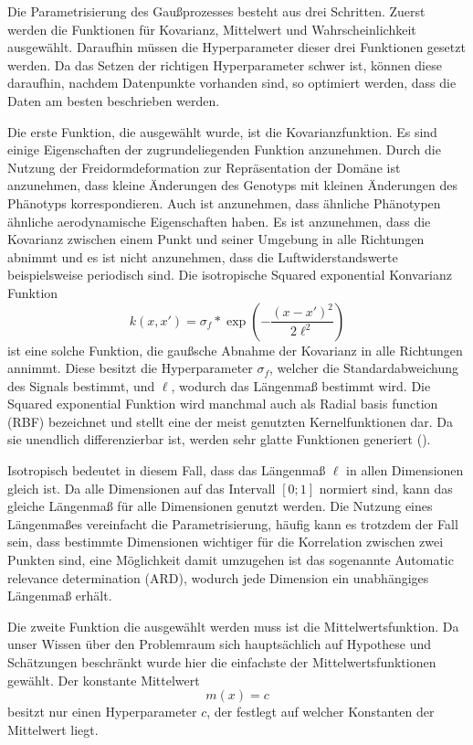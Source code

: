 Die Parametrisierung des Gaußprozesses besteht aus drei Schritten.
Zuerst werden die Funktionen für Kovarianz, Mittelwert und Wahrscheinlichkeit ausgewählt.
Daraufhin müssen die Hyperparameter dieser drei Funktionen gesetzt werden.
Da das Setzen der richtigen Hyperparameter schwer ist, können diese daraufhin, nachdem Datenpunkte vorhanden sind, so optimiert werden, dass die Daten am besten beschrieben werden.

Die erste Funktion, die ausgewählt wurde, ist die Kovarianzfunktion.
Es sind einige Eigenschaften der zugrundeliegenden Funktion anzunehmen.
Durch die Nutzung der Freidormdeformation zur Repräsentation der Domäne ist anzunehmen, dass kleine Änderungen des Genotyps mit kleinen Änderungen des Phänotyps korrespondieren.
Auch ist anzunehmen, dass ähnliche Phänotypen ähnliche aerodynamische Eigenschaften haben.
Es ist anzunehmen, dass die Kovarianz zwischen einem Punkt und seiner Umgebung in alle Richtungen abnimmt und es ist nicht anzunehmen, dass die Luftwiderstandswerte beispielsweise periodisch sind.
Die isotropische Squared exponential Konvarianz Funktion  
\[
	k(x,x') = \sigma_f * \exp\left(-\frac{(x-x')^2}{2\ell^2}\right)
\]
ist eine solche Funktion, die gaußsche Abnahme der Kovarianz in alle Richtungen annimmt.
Diese besitzt die Hyperparameter $\sigma_f$, welcher die Standardabweichung des Signals bestimmt, und $\ell$, wodurch das Längenmaß bestimmt wird.
Die Squared exponential Funktion wird manchmal auch als Radial basis function (RBF) bezeichnet und stellt eine der meist genutzten Kernelfunktionen dar.
Da sie unendlich differenzierbar ist, werden sehr glatte Funktionen generiert (\cite{Duvenaud.2014}).

Isotropisch bedeutet in diesem Fall, dass das Längenmaß $\ell$ in allen Dimensionen gleich ist.
Da alle Dimensionen auf das Intervall $[0;1]$ normiert sind, kann das gleiche Längenmaß für alle Dimensionen genutzt werden.
Die Nutzung eines Längenmaßes vereinfacht die Parametrisierung, häufig kann es trotzdem der Fall sein, dass bestimmte Dimensionen wichtiger für die Korrelation zwischen zwei Punkten sind, eine Möglichkeit damit umzugehen ist das sogenannte Automatic relevance determination (ARD), wodurch jede Dimension ein unabhängiges Längenmaß erhält.

Die zweite Funktion die ausgewählt werden muss ist die Mittelwertsfunktion. Da unser Wissen über den Problemraum sich hauptsächlich auf Hypothese und Schätzungen beschränkt wurde hier die einfachste der Mittelwertsfunktionen gewählt. 
Der konstante Mittelwert
\[
	m(x) = c
\]
besitzt nur einen Hyperparameter $c$, der festlegt auf welcher Konstanten der Mittelwert liegt.

